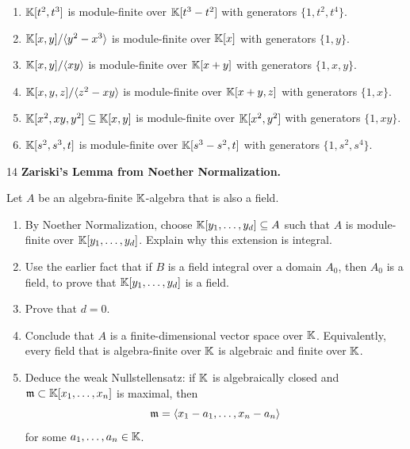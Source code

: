 \documentclass[Notebook.tex]{subfiles}
\begin{document}
\begin{solution}
    \bbni
    \begin{enumerate}
        \item $\mathbb K[t^2, t^3]$ is module-finite over $\mathbb K[t^3 - t^2]$ with generators $\{1, t^2, t^4\}$. 
        \item $\mathbb K[x,y]/\langle y^2-x^3\rangle$ is module-finite over $\mathbb K[x]$ with generators $\{1, y\}$. 
        \item $\mathbb K[x,y]/\langle xy\rangle$ is module-finite over $\mathbb K[x+y]$ with generators $\{1, x, y\}$. 
        \item $\mathbb K[x,y,z]/\langle z^2-xy\rangle$ is module-finite over $\mathbb K[x+y, z]$ with generators $\{1, x\}$. 
        \item $\mathbb K[x^2,xy,y^2]\subseteq \mathbb K[x,y]$ is module-finite over $\mathbb K[x^2, y^2]$ with generators $\{1, xy\}$. 
        \item $\mathbb K[s^2,s^3,t]$ is module-finite over $\mathbb K[s^3 - s^2, t]$ with generators $\{1, s^2, s^4\}$. 
    \end{enumerate}
\end{solution}

\newpage 

\begin{problem}{14} \textbf{Zariski's Lemma from Noether Normalization.} 
    
    Let $A$ be an algebra-finite $\mathbb K$-algebra that is also a field.
    \begin{enumerate}
        \item By Noether Normalization, choose $\mathbb K[y_1,\ldots,y_d]\subseteq A$ such that $A$ is module-finite over $\mathbb K[y_1,\ldots,y_d]$. Explain why this extension is integral.
        \item Use the earlier fact that if $B$ is a field integral over a domain $A_0$, then $A_0$ is a field, to prove that $\mathbb K[y_1,\ldots,y_d]$ is a field.
        \item Prove that $d=0$.
        \item Conclude that $A$ is a finite-dimensional vector space over $\mathbb K$. Equivalently, every field that is algebra-finite over $\mathbb K$ is algebraic and finite over $\mathbb K$.
        \item Deduce the weak Nullstellensatz: if $\mathbb K$ is algebraically closed and $\operatorname{\mathfrak{m}}\subset \mathbb K[x_1,\ldots,x_n]$ is maximal, then
        \[
        \operatorname{\mathfrak{m}}=\langle x_1-a_1,\ldots,x_n-a_n\rangle
        \]
        for some $a_1,\ldots,a_n\in \mathbb K$.
    \end{enumerate}    
\end{problem}
\end{document}
